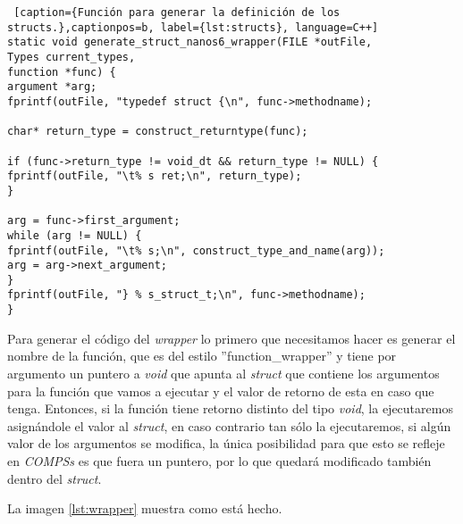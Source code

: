\begin{minipage}{\linewidth}
\begin{lstlisting} [caption={Función para generar la definición de los structs.},captionpos=b, label={lst:structs}, language=C++]
static void generate_struct_nanos6_wrapper(FILE *outFile, 
Types current_types,
function *func) {
argument *arg;
fprintf(outFile, "typedef struct {\n", func->methodname);

char* return_type = construct_returntype(func);

if (func->return_type != void_dt && return_type != NULL) {
fprintf(outFile, "\t% s ret;\n", return_type);
}

arg = func->first_argument;
while (arg != NULL) {
fprintf(outFile, "\t% s;\n", construct_type_and_name(arg));
arg = arg->next_argument;
}
fprintf(outFile, "} % s_struct_t;\n", func->methodname);
}
\end{lstlisting}
\end{minipage}

\par\bigskip
Para generar el código del \textit{wrapper} lo primero que necesitamos hacer es generar el nombre de la función, que es del estilo ''function\_wrapper'' y tiene por argumento un puntero a \textit{void} que apunta al \textit{struct} que contiene los argumentos para la función que vamos a ejecutar y el valor de retorno de esta en caso que tenga. Entonces, si la función tiene retorno distinto del tipo \textit{void}, la ejecutaremos asignándole el valor al \textit{struct}, en caso contrario tan sólo la ejecutaremos, si algún valor de los argumentos se modifica, la única posibilidad para que esto se refleje en \textit{COMPSs} es que fuera un puntero, por lo que quedará modificado también dentro del \textit{struct}.

\smallskip
La imagen \ref{lst:wrapper} muestra como está hecho.
\bigskip

